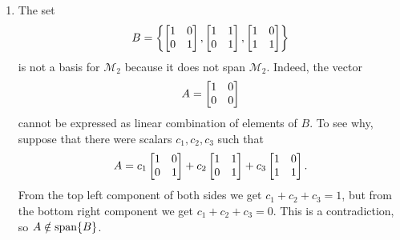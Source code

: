 \documentclass{homework}
\begin{document}
	\question \begin{enumerate}
		\item The set
		\begin{equation*}
			B = \left\{\left[\begin{matrix}1&0\\0&1\end{matrix}\right], \left[\begin{matrix}1&1\\0&1\end{matrix}\right], \left[\begin{matrix}1&0\\1&1\end{matrix}\right]\right\}
		\end{equation*}
		is not a basis for $\mathcal{M}_2$ because it does not span $\mathcal{M}_2$. Indeed, the vector
		\begin{equation*}
			A = \left[\begin{matrix}1&0\\0&0\end{matrix}\right]
		\end{equation*}
		cannot be expressed as linear combination of elements of $B$. To see why, suppose that there were scalars $c_1,c_2,c_3$ such that
		\begin{equation*}
			A = c_1\left[\begin{matrix}1&0\\0&1\end{matrix}\right] +  c_2\left[\begin{matrix}1&1\\0&1\end{matrix}\right] + c_3\left[\begin{matrix}1&0\\1&1\end{matrix}\right].
		\end{equation*}
		From the top left component of both sides we get $c_1+c_2+c_3 = 1$, but from the bottom right component we get $c_1+c_2+c_3 = 0$. This is a contradiction, so $A \notin \mathrm{span}\{B\}$.
	\end{enumerate}
	
\end{document}
